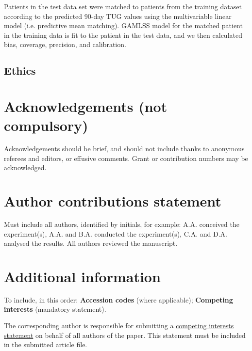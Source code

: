 \documentclass[fleqn,10pt]{wlscirep}\usepackage{knitr}
\begin{document}
Patients in the test data set were matched to patients from the training dataset according to the predicted 90-day TUG values using the multivariable linear model (i.e. predictive mean matching). GAMLSS model for the matched patient in the training data is fit to the patient in the test data, and we then calculated bias, coverage, precision, and calibration.

\subsection*{Ethics}







\section*{Acknowledgements (not compulsory)}

Acknowledgements should be brief, and should not include thanks to anonymous referees and editors, or effusive comments. Grant or contribution numbers may be acknowledged.

\section*{Author contributions statement}

Must include all authors, identified by initials, for example:
A.A. conceived the experiment(s),  A.A. and B.A. conducted the experiment(s), C.A. and D.A. analysed the results.  All authors reviewed the manuscript. 

\section*{Additional information}

To include, in this order: \textbf{Accession codes} (where applicable); \textbf{Competing interests} (mandatory statement). 

The corresponding author is responsible for submitting a \href{http://www.nature.com/srep/policies/index.html#competing}{competing interests statement} on behalf of all authors of the paper. This statement must be included in the submitted article file.
\end{document}
